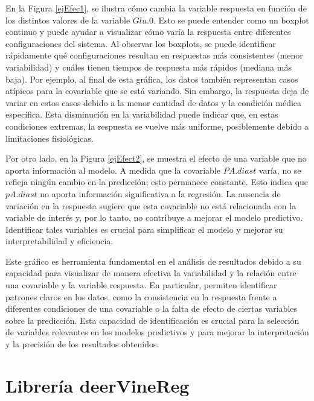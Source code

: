 En la Figura \ref{ejEfec1}, se ilustra cómo cambia la variable respuesta en función de los distintos valores de la variable $Glu.0$. Esto se puede entender como un boxplot continuo y puede ayudar a visualizar cómo varía la respuesta entre diferentes configuraciones del sistema. Al observar los boxplots, se puede identificar rápidamente qué configuraciones resultan en respuestas más consistentes (menor variabilidad) y cuáles tienen tiempos de respuesta más rápidos (mediana más baja). Por ejemplo, al final de esta gráfica, los datos también representan casos atípicos para la covariable que se está variando. Sin embargo, la respuesta deja de variar en estos casos debido a la menor cantidad de datos y la condición médica específica. Esta disminución en la variabilidad puede indicar que, en estas condiciones extremas, la respuesta se vuelve más uniforme, posiblemente debido a limitaciones fisiológicas.


Por otro lado, en la Figura \ref{ejEfect2}, se muestra el efecto de una variable que no aporta información al modelo. A medida que la covariable $PA.diast$ varía, no se refleja ningún cambio en la predicción; esto permanece constante. Esto indica que  $pA.diast$ no aporta información significativa a la regresión. La ausencia de variación en la respuesta sugiere que esta covariable no está relacionada con la variable de interés y, por lo tanto, no contribuye a mejorar el modelo predictivo. Identificar tales variables es crucial para simplificar el modelo y mejorar su interpretabilidad y eficiencia.


Este gráfico es herramienta fundamental en el análisis de resultados debido a su capacidad para visualizar de manera efectiva la variabilidad y la relación entre una covariable y la variable respuesta. En particular, permiten identificar patrones claros en los datos, como la consistencia en la respuesta frente a diferentes condiciones de una covariable o la falta de efecto de ciertas variables sobre la predicción. Esta capacidad de identificación es crucial para la selección de variables relevantes en los modelos predictivos y para mejorar la interpretación y la precisión de los resultados obtenidos. 


\vspace{-0.2cm}
\section{Librería deerVineReg}

